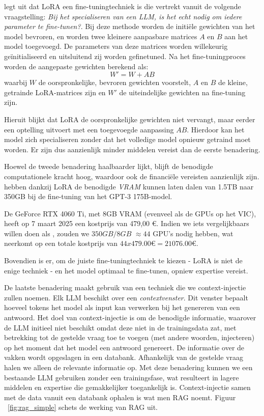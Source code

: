 \textcite{Hu2024} legt uit dat \acrshort{LoRA} een fine-tuningtechniek is die vertrekt vanuit de volgende vraagstelling: \textit{Bij het specialiseren van een \acrshort{LLM}, is het echt nodig om iedere parameter te fine-tunen?}. Bij deze methode worden de initiële gewichten van het model bevroren, en worden twee kleinere aanpasbare matrices $A$ en $B$ aan het model toegevoegd. De parameters van deze matrices worden willekeurig geïnitialiseerd en uitsluitend zij worden gefinetuned. Na het fine-tuningproces worden de aangepaste gewichten berekend als: \[W' = W + AB\] waarbij $W$ de oorspronkelijke, bevroren gewichten voorstelt, $A$ en $B$ de kleine, getrainde LoRA-matrices zijn en $W'$ de uiteindelijke gewichten na fine-tuning zijn. 

Hieruit blijkt dat \acrshort{LoRA} de oorspronkelijke gewichten niet vervangt, maar eerder een optelling uitvoert met een toegevoegde aanpassing $AB$. Hierdoor kan het model zich specialiseren zonder dat het volledige model opnieuw getraind moet worden. Er zijn dus aanzienlijk minder middelen vereist dan de eerste benadering.

Hoewel de tweede benadering haalbaarder lijkt, blijft de benodigde computationele kracht hoog, waardoor ook de financiële vereisten aanzienlijk zijn. \textcite{Hu2021} hebben dankzij \acrshort{LoRA} de benodigde \textit{VRAM} kunnen laten dalen van 1.5TB naar 350GB bij de fine-tuning van het GPT-3 175B-model.

De GeForce RTX 4060 Ti, met 8GB VRAM (evenveel als de GPUs op het VIC), heeft op 7 maart 2025 een kostprijs van 479,00 €. Indien we iets vergelijkbaars willen doen als \textcite{Hu2021}, zouden we $350GB / 8GB$ $\approx 44$ GPU's nodig hebben, wat neerkomt op een totale kostprijs van $44 x 479.00 € = 21 076.00 €$.

Bovendien is er, om de juiste fine-tuningtechniek te kiezen - LoRA is niet de enige techniek - en het model optimaal te fine-tunen, opniew expertise vereist.

De laatste benadering maakt gebruik van een techniek die we context-injectie zullen noemen. Elk \acrshort{LLM} beschikt over een \textit{contextvenster}. Dit venster bepaalt hoeveel tokens het model als input kan verwerken bij het genereren van een antwoord. Het doel van context-injectie is om de benodigde informatie, waarover de \acrshort{LLM} initieel niet beschikt omdat deze niet in de trainingsdata zat, met betrekking tot de gestelde vraag toe te voegen (met andere woorden, injecteren) op het moment dat het model een antwoord genereert. De informatie over de vakken wordt opgeslagen in een databank. Afhankelijk van de gestelde vraag halen we alleen de relevante informatie op. Met deze benadering kunnen we een bestaande LLM gebruiken zonder een trainingsfase, wat resulteert in lagere middelen en expertise die gemakkelijker toegankelijk is. Context-injectie samen met de data vanuit een databank ophalen is wat men \acrfull{RAG} noemt. Figuur ~\ref{fig:rag_simple} schets de werking van \acrshort{RAG} uit. 

